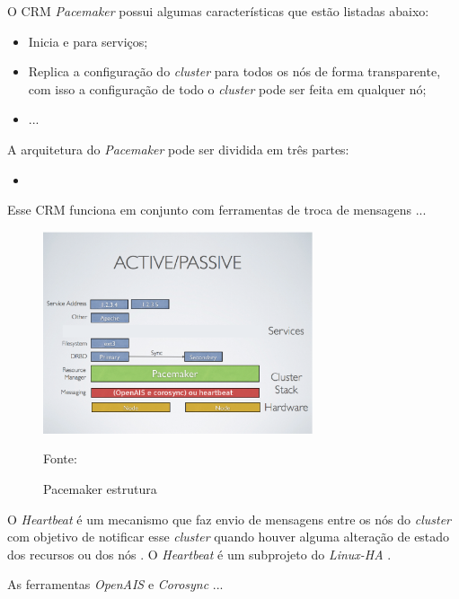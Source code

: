 O \ac{CRM} \textit{Pacemaker} possui algumas características que estão listadas abaixo:
\begin{itemize}
 \item Inicia e para serviços;
 \item Replica a configuração do \textit{cluster} para todos os nós de forma transparente, com isso a configuração de todo o \textit{cluster} pode ser feita em qualquer nó;
 \item ...
\end{itemize}

A arquitetura do \textit{Pacemaker} pode ser dividida em três partes:
\begin{itemize}
 \item 
\end{itemize}

Esse \ac{CRM} funciona em conjunto com ferramentas de troca de mensagens ...

\begin{figure}[h!]
 \centering
 \includegraphics[width=300px]{img/pacemaker_tools.eps}
 \caption{Pacemaker estrutura}
 Fonte: \citet{pacemaker}
 \label{fig:pacemaker_tools}
\end{figure}

O \textit{Heartbeat} é um mecanismo que faz envio de mensagens entre os nós do \textit{cluster} com objetivo de notificar esse 
\textit{cluster} quando houver alguma alteração de estado dos recursos ou dos nós \cite{clusterlabs}. O \textit{Heartbeat} é um subprojeto do
\textit{Linux-HA} \cite{linuxha}.

As ferramentas \textit{OpenAIS} e \textit{Corosync} ...

